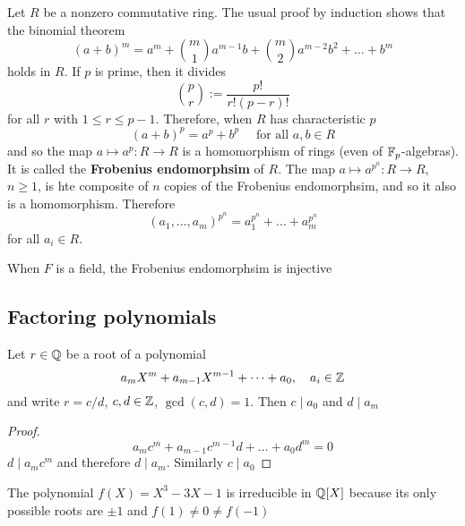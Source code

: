 \documentclass[11pt]{article}
\begin{document}
Let \(R\) be a nonzero commutative ring. The usual proof by induction shows that the binomial
theorem
\begin{equation*}
(a+b)^m=a^m+\binom{m}{1}a^{m-1}b+\binom{m}{2}a^{m-2}b^2+\dots+b^m
\end{equation*}
holds in \(R\). If \(p\) is prime, then it divides
\begin{equation*}
\binom{p}{r}:=\frac{p!}{r!(p-r)!}
\end{equation*}
for all \(r\) with \(1\le r\le p-1\). Therefore, when \(R\) has characteristic \(p\)
\begin{equation*}
(a+b)^p=a^p+b^p\quad\text{ for all }a,b\in R
\end{equation*}
and so the map \(a\mapsto a^p:R\to R\) is a homomorphism of rings (even of \(\mathbb{F}_p\)-algebras). It is
called the \textbf{Frobenius endomorphsim} of \(R\). The map \(a\mapsto a^{p^n}:R\to R\), \(n\ge 1\), is hte
composite of \(n\) copies of the Frobenius endomorphsim, and so it also is a homomorphism.
Therefore
\begin{equation*}
(a_1,\dots,a_m)^{p^n}=a_1^{p^n}+\dots+a_m^{p^n}
\end{equation*}
for all \(a_i\in R\).

When \(F\) is a field, the Frobenius endomorphsim is injective
\subsection{Factoring polynomials}
\label{sec:orgc940b6c}
\begin{proposition}[]
Let \(r\in\mathbb{Q}\) be a root of a polynomial
\begin{equation*}
a_mX^m+a_{m-1}X^{m-1}+\dots+a_0,\quad a_i\in\mathbb{Z}
\end{equation*}
and write \(r=c/d\), \(c,d\in\mathbb{Z}\), \(\gcd(c,d)=1\). Then \(c\mid a_0\) and \(d\mid a_m\)
\end{proposition}

\begin{proof}
\begin{equation*}
a_mc^m+a_{m-1}c^{m-1}d+\dots+a_0d^m=0
\end{equation*}
\(d\mid a_mc^m\) and therefore \(d\mid a_m\). Similarly \(c\mid a_0\)
\end{proof}

\begin{examplle}[]
The polynomial \(f(X)=X^3-3X-1\) is irreducible in \(\mathbb{Q}[X]\) because its only possible roots
are \(\pm 1\) and \(f(1)\neq 0\neq f(-1)\)
\end{examplle}
\end{document}
